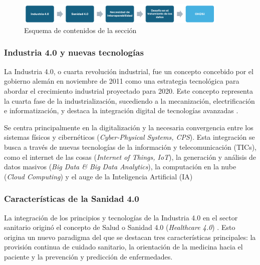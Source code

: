 \begin{figure}[H]
    \centering
    \includegraphics[width=0.90\textwidth]{figures/esquemaMarcoContextual.png}
    \caption{Esquema de contenidos de la sección}
    \label{fig:esquemaMarcoContextual}
\end{figure}


\subsubsection{Industria 4.0 y nuevas tecnologías}

La Industria 4.0, o cuarta revolución industrial, fue un concepto concebido por el gobierno alemán en noviembre de 2011 como una estrategia tecnológica para abordar el crecimiento industrial proyectado para 2020.
Este concepto representa la cuarta fase de la industrialización, sucediendo a la mecanización, electrificación e informatización, y destaca la integración digital de tecnologías avanzadas \cite{lasi2014industry}.

Se centra principalmente en la digitalización y la necesaria convergencia entre los sistemas físicos y cibernéticos (\textit{Cyber-Physical Systems, CPS}). Esta integración se busca a través de nuevas tecnologías de la información y telecomunicación (TICs), como el internet de las cosas (\textit{Internet of Things, IoT}), la generación y análisis de datos masivos (\textit{Big Data \& Big Data Analytics}), la computación en la nube (\textit{Cloud Computing}) y el auge de la Inteligencia Artificial (IA) \cite{lasi2014industry, chen2020times, tortorella2020healthcare}

\subsubsection{Características de la Sanidad 4.0}

La integración de los principios y tecnologías de la Industria 4.0 en el sector sanitario originó el concepto de Salud o Sanidad 4.0 (\textit{Healthcare 4.0}) \cite{tortorella2020healthcare, tortorella2021impacts}.  %
Esto origina un nuevo paradigma del que se destacan tres  características principales: la provisión continua de cuidado sanitario, la orientación de la medicina hacia el paciente y la prevención y predicción de enfermedades.


